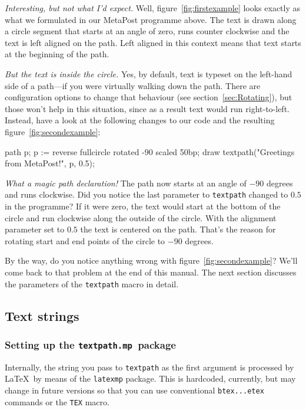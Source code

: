 \documentclass{article}
\newcommand*{\cmd}[1]{\texttt{#1}}
\newcommand*{\pkg}{\cmd{textpath.mp}}
\newcommand{\user}[1]{\emph{#1}}
\newenvironment{listing}{%
  \small%
  \verbatim%
}{%
  \endverbatim%
}
\begin{document}
\user{Interesting, but not what I'd expect.}  Well, figure~\ref{fig:firstexample} looks exactly as what we formulated in our MetaPost programme above.  The text is drawn along a circle segment that starts at an angle of zero, runs counter clockwise and the text is left aligned on the path.  Left aligned in this context means that text starts at the beginning of the path.

\user{But the text is inside the circle.}  Yes, by default, text is typeset on the left-hand side of a path---if you were virtually walking down the path.  There are configuration options to change that behaviour (see section~\ref{sec:Rotating}), but those won't help in this situation, since as a result text would run right-to-left.  Instead, have a look at the following changes to our code and the resulting figure~\ref{fig:secondexample}:

\begin{listing}
path p;
p := reverse fullcircle rotated -90 scaled 50bp;
draw textpath("Greetings from MetaPost!", p, 0.5);
\end{listing}

\user{What a magic path declaration!}  The path now starts at an angle of $-90$ degrees and runs clockwise.  Did you notice the last parameter to \cmd{textpath} changed to $0.5$ in the programme?  If it were zero, the text would start at the bottom of the circle and run clockwise along the outside of the circle.  With the alignment parameter set to $0.5$ the text is centered on the path.  That's the reason for rotating start and end points of the circle to $-90$ degrees.

By the way, do you notice anything wrong with figure~\ref{fig:secondexample}?  We'll come back to that problem at the end of this manual.  The next section discusses the parameters of the \cmd{textpath} macro in detail.

\subsection{Text strings}
\subsubsection{Setting up the \pkg\ package}
Internally, the string you pass to \cmd{textpath} as the first argument is processed by \LaTeX\ by means of the \cmd{latexmp} package.  This is hardcoded, currently, but may change in future versions so that you can use conventional \cmd{btex...etex} commands or the \cmd{TEX} macro.
\end{document}
